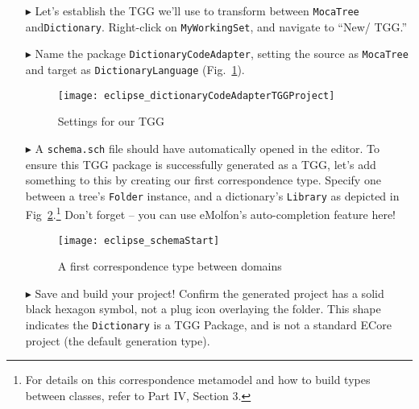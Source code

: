 \begin{enumerate}

\item[$\blacktriangleright$] Let's establish the TGG we'll use to transform between  \texttt{MocaTree} and\texttt{Dictionary}. Right-click on
\texttt{MyWorkingSet}, and navigate to ``New/ TGG.''

\item[$\blacktriangleright$] Name the package \texttt{DictionaryCodeAdapter}, setting the source as \texttt{MocaTree} and
target as \texttt{DictionaryLanguage} (Fig.~\ref{eclipse:newTGGProject}).

\begin{figure}[htbp]
\begin{center}
  \texttt{[image: eclipse\_dictionaryCodeAdapterTGGProject]}
  \caption{Settings for our TGG}
  \label{eclipse:newTGGProject}
\end{center}
\end{figure}

\item[$\blacktriangleright$] A \texttt{schema.sch} file should have automatically opened in the editor. To ensure this TGG package is successfully generated as
a TGG, let's add something to this by creating our first correspondence type. Specify one between a tree's \texttt{Folder} instance, and a dictionary's
\texttt{Library} as depicted in Fig~\ref{eclipse:firstSchema}.\footnote{For details on this correspondence metamodel and how to build types
between classes, refer to Part IV, Section 3.} Don't forget -- you can use eMolfon's auto-completion feature here!

\begin{figure}[htbp]
\begin{center}
  \texttt{[image: eclipse\_schemaStart]}
  \caption{A first correspondence type between domains}
  \label{eclipse:firstSchema}
\end{center}
\end{figure}

\item[$\blacktriangleright$] Save and build your project! Confirm the generated project has a solid black hexagon symbol, not a plug icon
overlaying the folder. This shape indicates the \texttt{Dictionary} is a TGG Package, and is not a standard ECore project (the default generation type).

\end{enumerate}
